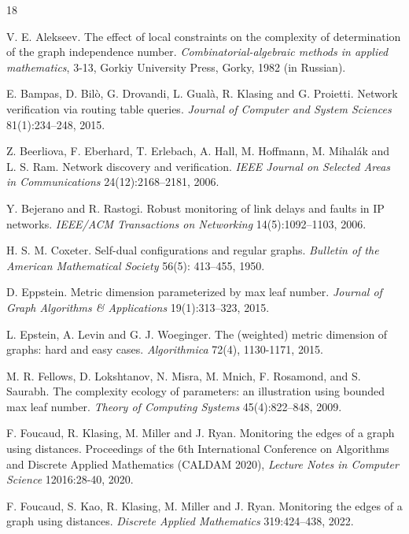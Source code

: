 \documentclass[10pt,a4paper]{article}
\begin{document}
\begin{thebibliography}{18}

V. E. Alekseev. The effect of local constraints on the complexity of determination of the graph independence number. \emph{Combinatorial-algebraic methods in applied mathematics}, 3-13, Gorkiy University Press, Gorky, 1982 (in Russian).

E. Bampas, D. Bil\`o, G. Drovandi, L. Gual\`a, R. Klasing and G. Proietti. Network verification via routing table queries. \emph{Journal of Computer and System Sciences} 81(1):234–248, 2015.

 Z. Beerliova, F. Eberhard, T. Erlebach, A. Hall, M. Hoffmann, M. Mihal\'ak and L. S. Ram. Network discovery and verification. \emph{IEEE Journal on Selected Areas in Communications} 24(12):2168--2181, 2006.

 Y. Bejerano and R. Rastogi. Robust monitoring of link delays and faults in IP networks. \emph{IEEE/ACM Transactions on Networking} 14(5):1092--1103, 2006.

 H. S. M. Coxeter. Self-dual configurations and regular graphs. \emph{Bulletin of the American Mathematical Society} 56(5): 413--455, 1950. 

 D. Eppstein. Metric dimension parameterized by max leaf number. \emph{Journal of Graph Algorithms \& Applications} 19(1):313--323, 2015.

L. Epstein, A. Levin and G. J. Woeginger. The (weighted) metric dimension of graphs: hard and easy cases. \emph{Algorithmica} 72(4), 1130-1171, 2015.




 M. R. Fellows, D. Lokshtanov, N. Misra, M. Mnich, F. Rosamond, and
S. Saurabh. The complexity ecology of parameters: an illustration using
bounded max leaf number. \emph{Theory of Computing Systems} 45(4):822--848, 2009.



F. Foucaud, R. Klasing, M. Miller and J. Ryan. Monitoring the edges of a graph using distances. Proceedings of the 6th International Conference on Algorithms and Discrete Applied Mathematics (CALDAM 2020), \emph{Lecture Notes in Computer Science} 12016:28-40, 2020.

F. Foucaud, S. Kao, R. Klasing, M. Miller and J. Ryan. Monitoring the edges of a graph using distances. \emph{Discrete Applied Mathematics} 319:424--438, 2022.


\end{thebibliography}
\end{document}
